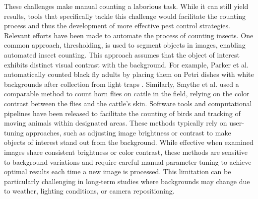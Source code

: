 These challenges make manual counting a laborious task. While it can still yield results, tools that specifically tackle this challenge would facilitate the counting process and thus the development of more effective pest control strategies. Relevant efforts have been made to automate the process of counting insects. One common approach, thresholding, is used to segment objects in images, enabling automated insect counting. This approach assumes that the object of interest exhibits distinct visual contrast with the background. For example, Parker et al. automatically counted black fly adults by placing them on Petri dishes with white backgrounds after collection from light traps \cite{parker_using_2020}. Similarly, Smythe et al. \cite{smythe_using_2020} used a comparable method to count horn flies on cattle in the field, relying on the color contrast between the flies and the cattle's skin. Software tools and computational pipelines have been released to facilitate the counting of birds \cite{marchowski_drones_2021} and tracking of moving animals \cite{chiara_animalta_2023} within designated areas. These methods typically rely on user-tuning approaches, such as adjusting image brightness or contrast to make objects of interest stand out from the background. While effective when examined images share consistent brightness or color contrast, these methods are sensitive to background variations and require careful manual parameter tuning to achieve optimal results each time a new image is processed. This limitation can be particularly challenging in long-term studies where backgrounds may change due to weather, lighting conditions, or camera repositioning.

